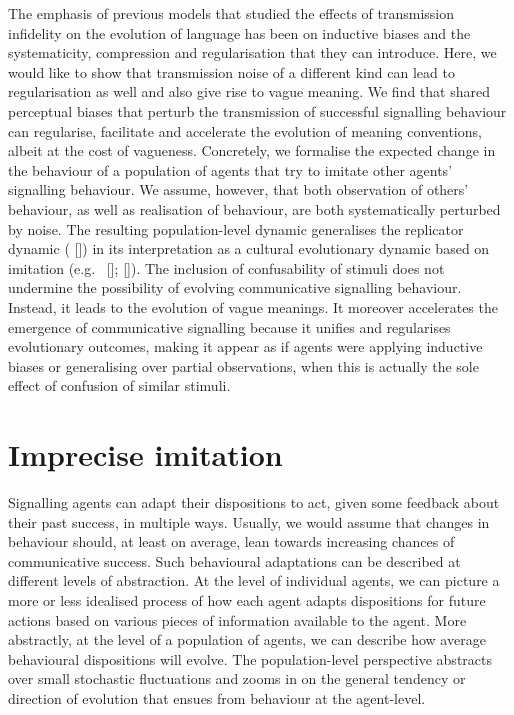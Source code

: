 \documentclass[12pt,english]{article}
\numberwithin{equation}{section}
\newcommand{\citealtbjps}[1]{\citeauthor{#1} [\citeyear{#1}]}
\newcommand{\citepbjps}[1]{(\citeauthor{#1} [\citeyear{#1}])}
\begin{document}
The emphasis of previous models that studied the effects of transmission infidelity on the
evolution of language has been on inductive biases and the systematicity, compression and
regularisation that they can introduce. Here, we would like to show that transmission noise of
a different kind can lead to regularisation as well and also give rise to vague meaning. We
find that shared perceptual biases that perturb the transmission of successful signalling
behaviour can regularise, facilitate and accelerate the evolution of meaning conventions, albeit
at the cost of vagueness. Concretely, we formalise the expected change in the behaviour of a
population of agents that try to imitate other agents' signalling behaviour. We assume, however,
that both observation of others' behaviour, as well as realisation of behaviour, are both
systematically perturbed by noise. The resulting population-level dynamic generalises the
replicator dynamic \citepbjps{TaylorJonker1978:Evolutionary-St} in its interpretation as a cultural
evolutionary dynamic based on imitation
(e.g.~\citealtbjps{Helbing1996:A-Stochastic-Be}; \citealtbjps{Schlag1998:Why-Imitate-and}). The inclusion of
confusability of stimuli does not undermine the possibility of evolving communicative signalling
behaviour. Instead, it leads to the evolution of vague meanings. It moreover accelerates the
emergence of communicative signalling because it unifies and regularises evolutionary outcomes,
making it appear as if agents were applying inductive biases or generalising over partial
observations, when this is actually the sole effect of confusion of similar stimuli.




\section{Imprecise imitation}
\label{sec:repl-diff-dynam}

Signalling agents can adapt their dispositions to act, given some feedback about their past
success, in multiple ways. Usually, we would assume that changes in behaviour should, at least
on average, lean towards increasing chances of communicative success. Such behavioural
adaptations can be described at different levels of abstraction. At the level of individual
agents, we can picture a more or less idealised process of how each agent adapts dispositions
for future actions based on various pieces of information available to the agent. More
abstractly, at the level of a population of agents, we can describe how average behavioural
dispositions will evolve. The population-level perspective abstracts over small stochastic
fluctuations and zooms in on the general tendency or direction of evolution that ensues from
behaviour at the agent-level.
\end{document}
